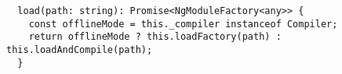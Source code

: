 \begin{verbatim}
  load(path: string): Promise<NgModuleFactory<any>> {
    const offlineMode = this._compiler instanceof Compiler;
    return offlineMode ? this.loadFactory(path) : this.loadAndCompile(path);
  }
\end{verbatim}
